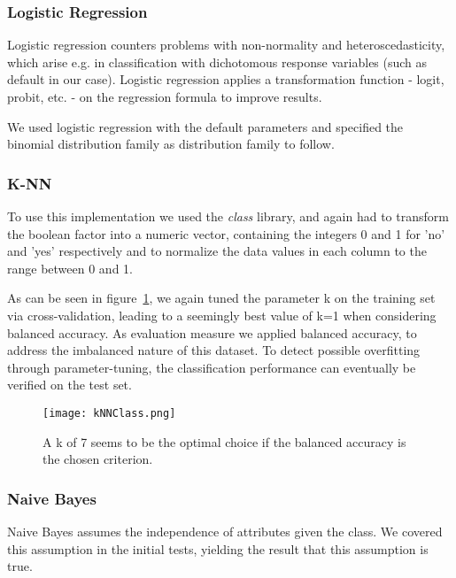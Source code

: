 \documentclass[a4paper]{article}
\begin{document}
\subsubsection{Logistic Regression}
Logistic regression counters problems with non-normality and heteroscedasticity, which arise e.g. in classification with dichotomous response variables (such as default in our case). Logistic regression applies a transformation function - logit, probit, etc. - on the regression formula to improve results.

We used logistic regression with the default parameters and specified the binomial distribution family as distribution family to follow.
\subsubsection{K-NN}

To use this implementation we used the \textit{class} library, and again had to transform the boolean factor into a numeric vector, containing the integers 0 and 1 for 'no' and 'yes' respectively and to normalize the data values in each column to the range between 0 and 1.

As can be seen in figure~\ref{fig:kNNClass}, we again tuned the parameter k on the training set via cross-validation, leading to a seemingly best value of k=1 when considering balanced accuracy. As evaluation measure we applied balanced accuracy, to address the imbalanced nature of this dataset. To detect possible overfitting through parameter-tuning, the classification performance can eventually be verified on the test set. 

 \begin{figure}[H]
 	\centering
 	\texttt{[image: kNNClass.png]}
 	\caption{\label{fig:kNNClass} A k of 7 seems to be the optimal choice if the balanced accuracy is the chosen criterion.}
 \end{figure}

\subsubsection{Naive Bayes}
Naive Bayes assumes the independence of attributes given the class. We covered this assumption in the initial tests, yielding the result that this assumption is true.
\end{document}

